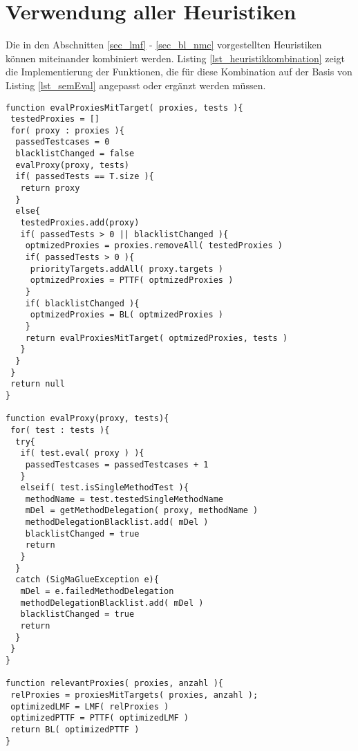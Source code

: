 \chapter{Verwendung aller Heuristiken}\label{app_semEvalMitAllenHeuristiken}
Die in den Abschnitten \ref{sec_lmf} - \ref{sec_bl_nmc} vorgestellten \Gls{Heuristik}en können miteinander kombiniert werden. Listing \ref{lst_heuristikkombination} zeigt die Implementierung der Funktionen, die für diese Kombination auf der Basis von Listing \ref{lst_semEval} angepasst oder ergänzt werden müssen.

\begin{lstlisting}[style = pseudo, caption = Kombination aller Heuristiken, captionpos = b, label = lst_heuristikkombination]
function evalProxiesMitTarget( proxies, tests ){
 testedProxies = []
 for( proxy : proxies ){
  passedTestcases = 0
  blacklistChanged = false
  evalProxy(proxy, tests)
  if( passedTests == T.size ){
   return proxy
  }
  else{
   testedProxies.add(proxy)
   if( passedTests > 0 || blacklistChanged ){
    optmizedProxies = proxies.removeAll( testedProxies )
    if( passedTests > 0 ){
     priorityTargets.addAll( proxy.targets )
     optmizedProxies = PTTF( optmizedProxies )	
    }
    if( blacklistChanged ){
     optmizedProxies = BL( optmizedProxies )	
    }
    return evalProxiesMitTarget( optmizedProxies, tests )
   }
  }
 }
 return null
}

function evalProxy(proxy, tests){
 for( test : tests ){
  try{
   if( test.eval( proxy ) ){
    passedTestcases = passedTestcases + 1
   }
   elseif( test.isSingleMethodTest ){
    methodName = test.testedSingleMethodName
    mDel = getMethodDelegation( proxy, methodName )
    methodDelegationBlacklist.add( mDel )
    blacklistChanged = true
    return
   }
  }
  catch (SigMaGlueException e){
   mDel = e.failedMethodDelegation
   methodDelegationBlacklist.add( mDel )
   blacklistChanged = true
   return
  } 
 }
}

function relevantProxies( proxies, anzahl ){
 relProxies = proxiesMitTargets( proxies, anzahl );
 optimizedLMF = LMF( relProxies )
 optimizedPTTF = PTTF( optimizedLMF )
 return BL( optimizedPTTF )
} 
\end{lstlisting}